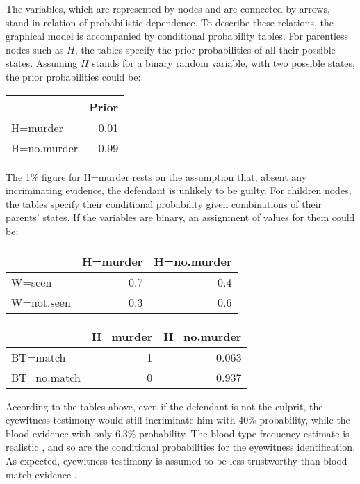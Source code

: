 \documentclass{article}
\begin{document}
The variables, which are represented by nodes and are connected by arrows, stand in relation of probabilistic dependence. To describe these relations, 
the graphical model is accompanied by conditional probability tables. %
For parentless nodes such as $H$, the tables specify 
the prior probabilities of all their possible states. Assuming $H$ stands for a binary random variable, with two possible states, 
the prior probabilities 
could be:
%
\begin{table}[H]
\centering
\begin{tabular}{lr}
\toprule
  & Prior\\
\midrule
H=murder & 0.01\\
H=no.murder & 0.99\\
\bottomrule
\end{tabular}
\end{table}
% 
\noindent
The 1\% figure for H=murder rests on the assumption that, absent any incriminating evidence, the defendant is unlikely to be guilty. For children nodes, the tables specify their conditional probability given combinations of their parents' states.  If the variables are  binary, an assignment of values for them could be:
%
\begin{table}[H]
\centering
\begin{tabular}{lrr}
\toprule
  & H=murder & H=no.murder\\
\midrule
W=seen & 0.7 & 0.4\\
W=not.seen & 0.3 & 0.6\\
\bottomrule
\end{tabular}
\end{table}

\begin{table}[H]
\centering
\begin{tabular}{lrr}
\toprule
  & H=murder & H=no.murder\\
\midrule
BT=match & 1 & 0.063\\
BT=no.match & 0 & 0.937\\
\bottomrule
\end{tabular}
\end{table}
%
\noindent
According to the tables above, even if the defendant is not the culprit, the eyewitness testimony would still incriminate him with 40\% probability, while the blood evidence with only 6.3\% probability. The blood type frequency estimate is realistic \citep[141]{lucy2013introduction}, and so are the conditional probabilities for the eyewitness identification. 
As expected, eyewitness testimony is assumed to be less trustworthy than blood match evidence  \citep[but for complications about assessing the reliability of eyewitness testimony, see][]{wixted2017RelationshipEyewitnessConfidence, Urbaniak2020Decision}.
\end{document}
